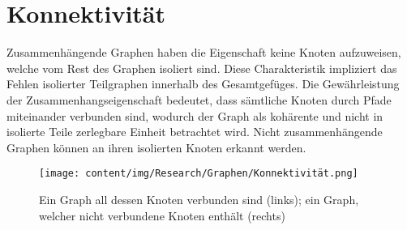 \section{Konnektivität}

Zusammenhängende Graphen haben die Eigenschaft keine Knoten aufzuweisen, welche vom Rest des Graphen isoliert sind. Diese Charakteristik impliziert das Fehlen isolierter Teilgraphen innerhalb des Gesamtgefüges. Die Gewährleistung der Zusammenhangseigenschaft bedeutet, dass sämtliche Knoten durch Pfade miteinander verbunden sind, wodurch der Graph als kohärente und nicht in isolierte Teile zerlegbare Einheit betrachtet wird. Nicht zusammenhängende Graphen können an ihren isolierten Knoten erkannt werden. \cite{kleinzusammenhang}

\begin{figure}
    \centering
    \texttt{[image: content/img/Research/Graphen/Konnektivität.png]}
    \caption{Ein Graph all dessen Knoten verbunden sind (links); ein Graph, welcher nicht verbundene Knoten enthält (rechts)}
    \label{fig:konnektivität}
\end{figure}
\FloatBarrier